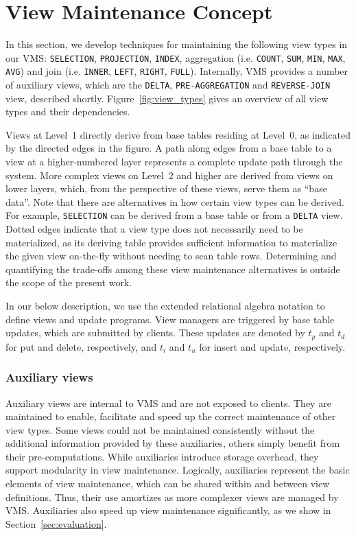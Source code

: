 \section{View Maintenance Concept} 
\label{sec:view_maintenance} 


In this section, we develop techniques for maintaining the following
view types in our VMS: \texttt{SELECTION}, \texttt{PROJECTION},
\texttt{INDEX}, aggregation (i.e. \texttt{COUNT}, \texttt{SUM},
\texttt{MIN}, \texttt{MAX}, \texttt{AVG}) and join
(i.e. \texttt{INNER}, \texttt{LEFT}, \texttt{RIGHT},
\texttt{FULL}). Internally, VMS provides a number of auxiliary views,
which are the \texttt{DELTA}, \texttt{PRE-AGGREGATION} and
\texttt{REVERSE-JOIN} view, described
shortly. Figure~\ref{fig:view_types} gives an overview of all view
types and their dependencies.

Views at Level~1 directly derive from base tables residing at Level~0,
as indicated by the directed edges in the figure. A path along edges
from a base table to a view at a higher-numbered layer represents a
complete update path through the system.  More complex views on
Level~2 and higher are derived from views on lower layers, which, from
the perspective of these views, serve them as ``base data''.  Note
that there are alternatives in how certain view types can be
derived. For example, \texttt{SELECTION} can be derived from a base
table or from a \texttt{DELTA} view.  Dotted edges indicate that a
view type does not necessarily need to be materialized, as its
deriving table provides sufficient information to materialize the
given view on-the-fly without needing to scan table rows.  Determining
and quantifying the trade-offs among these view maintenance
alternatives is outside the scope of the present work.

In our below description, we use the extended relational algebra
notation to define views and update programs. View managers are
triggered by base table updates, which are submitted by clients. These updates are
denoted by $t_p$ and $t_d$ for put and delete, respectively, and $t_i$
and $t_u$ for insert and update, respectively.

\subsubsection{Auxiliary views}
\label{subsec:auxiliary_views}

Auxiliary views are internal to VMS and are not exposed to clients.
They are maintained to enable, facilitate and speed up the correct
maintenance of other view types.  Some views could not be maintained
consistently without the additional information provided by these
auxiliaries, others simply benefit from their pre-computations.  While
auxiliaries introduce storage overhead, they support modularity in 
view maintenance. Logically, auxiliaries represent the basic elements 
of view maintenance, which can be shared within and between view 
definitions. Thus, their use amortizes  as more
complexer views are managed by VMS.
%
%
Auxiliaries also speed up view maintenance significantly, as we show
in Section~\ref{sec:evaluation}.

